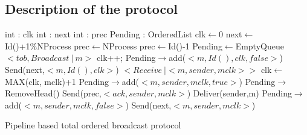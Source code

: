 \documentclass[a4paper]{article}
\begin{document}
\subsection{Description of the protocol}
\begin{algorithm}[H]
    \centering
    \begin{algorithmic}[5]
        \Data
        \State int : clk
        \State int : next
        \State int : prec
        \State Pending : OrderedList
        \EndData
        \Init
        \State clk$\gets$0
        \State next$\gets$Id()+1\%NProcess
        \State prec$\gets$NProcess
        \Else
        \State prec$\gets$Id()-1
        \EndIf
        \State Pending$\gets$EmptyQueue
        \EndInit
        \Event $< tob,Broadcast\ |\ m> $
        \State clk++;
        \State Pending$\rightarrow$add($<m,Id(), clk, false>$) 
        \State Send(next,$<m,Id(),clk>$)
        \EndEvent
        \Event $<Receive\ | <m,sender, mclk>>$
        \State clk$\gets$MAX(clk, mclk)+1
        \State Pending$\rightarrow$add($<m,sender,mclk,true>$)
        \State Pending$\rightarrow$RemoveHead()
        \State Send(prec,$<ack,sender,mclk>$)
        \State Deliver(sender,m)
        \EndIf
        \Else
        \State Pending$\rightarrow$add($<m,sender,mclk,false>$)
        \State Send(next,$<m,sender,mclk>$)
        \EndIf
        \EndEvent
    \end{algorithmic}
    \caption{Pipeline based total ordered broadcast protocol}
\end{algorithm}
\end{document}
